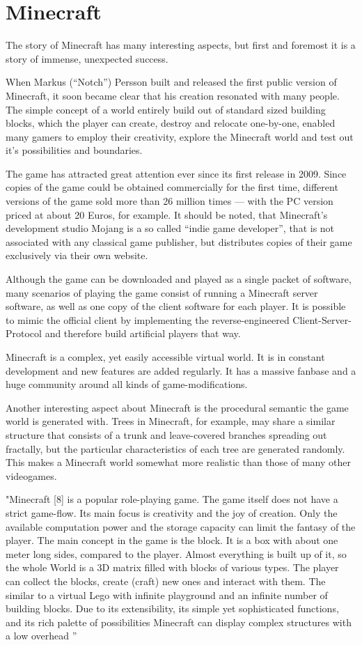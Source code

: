\chapter{Minecraft}
The story of Minecraft has many interesting aspects, but first and foremost it is a story of immense, unexpected success.

When Markus (``Notch'') Persson built and released the first public version of Minecraft, it soon became clear that his creation resonated with many people. The simple concept of a world entirely build out of standard sized building blocks, which the player can create, destroy and relocate one-by-one, enabled many gamers to employ their creativity, explore the Minecraft world and test out it's possibilities and boundaries.

The game has attracted great attention ever since its first release in 2009. Since copies of the game could be obtained commercially for the first time, different versions of the game sold more than 26 million times --- with the PC version priced at about 20 Euros, for example. It should be noted, that Minecraft's development studio Mojang is a so called ``indie game developer'', that is not associated with any classical game publisher, but distributes copies of their game exclusively via their own website.

Although the game can be downloaded and played as a single packet of software, many scenarios of playing the game consist of running a Minecraft server software, as well as one copy of the client software for each player. It is possible to mimic the official client by implementing the reverse-engineered Client-Server-Protocol and therefore build artificial players that way.

Minecraft is a complex, yet easily accessible virtual world. It is in constant development and new features are added regularly. It has a massive fanbase and a huge community around all kinds of game-modifications.

Another interesting aspect about Minecraft is the procedural semantic the game world is generated with. Trees in Minecraft, for example, may share a similar structure that consists of a trunk and leave-covered branches spreading out fractally, but the particular characteristics of each tree are generated randomly. This makes a Minecraft world somewhat more realistic than those of many other videogames.

"Minecraft [8] is a popular role-playing game. The game
itself does not have a strict game-flow. Its main focus is creativity and the joy of creation. Only the available computation
power and the storage capacity can limit the fantasy of the
player.
The main concept in the game is the block. It is a box with
about one meter long sides, compared to the player. Almost
everything is built up of it, so the whole World is a 3D matrix
filled with blocks of various types. The player can collect the
blocks, create (craft) new ones 
and interact with them. The
similar to a virtual Lego with 
infinite playground and
an infinite number of building blocks.
Due to its extensibility, its simple yet sophisticated functions, and its rich palette of possibilities Minecraft can display
complex structures
 with a low 
 overhead
''\cite{baloghcodemetropolis}

